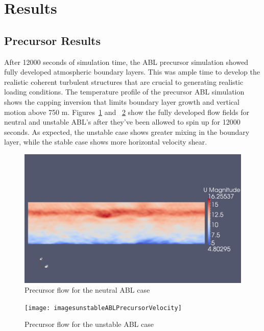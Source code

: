 \section{Results}

\subsection{Precursor Results}
After 12000 seconds of simulation time, the ABL precursor simulation showed fully developed atmospheric boundary layers.  This was ample time to develop the realistic coherent turbulent structures that are crucial to generating realistic loading conditions.  The temperature profile of the precursor ABL simulation shows the capping inversion that limits boundary layer growth and vertical motion above 750 m.  Figures~\ref{fig:neutralABLPrecursorVelocity} and ~\ref{fig:unstableABLPrecursorVelocity} show the fully developed flow fields for neutral and unstable ABL's after they've been allowed to spin up for 12000 seconds.  As expected, the unstable case shows greater mixing in the boundary layer, while the stable case shows more horizontal velocity shear.

\begin{figure}
\centering
\includegraphics[width=\textwidth]{images/neutralABLPrecursorVelocity}
\caption{Precursor flow for the neutral ABL case}
\label{fig:neutralABLPrecursorVelocity}
\end{figure}

\begin{figure}
\centering
\texttt{[image: imagesunstableABLPrecursorVelocity]}
\caption{Precursor flow for the unstable ABL case}
\label{fig:unstableABLPrecursorVelocity}
\end{figure}

